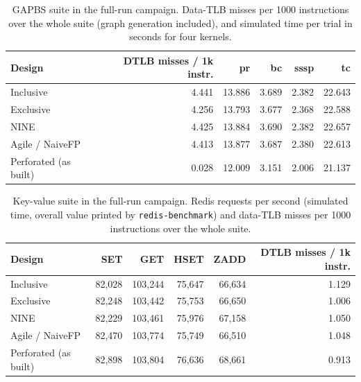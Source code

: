 \begin{table}[H]
\centering
\small
\caption{GAPBS suite in the full-run campaign. Data-TLB misses per 1000 instructions over the whole suite (graph generation included), and simulated time per trial in seconds for four kernels.}
\label{tab:fullrun_gapbs}
\begin{tabular}{l r r r r r}
\toprule
\textbf{Design} & \textbf{DTLB misses / 1k instr.} & \textbf{pr} & \textbf{bc} & \textbf{sssp} & \textbf{tc} \\
\midrule
Inclusive & 4.441 & 13.886 & 3.689 & 2.382 & 22.643 \\
Exclusive & 4.256 & 13.793 & 3.677 & 2.368 & 22.588 \\
NINE & 4.425 & 13.884 & 3.690 & 2.382 & 22.657 \\
Agile / NaiveFP & 4.413 & 13.877 & 3.687 & 2.380 & 22.613 \\
Perforated (as built) & 0.028 & 12.009 & 3.151 & 2.006 & 21.137 \\
\bottomrule
\end{tabular}
\end{table}

\begin{table}[H]
\centering
\small
\caption{Key-value suite in the full-run campaign. Redis requests per second (simulated time, overall value printed by \texttt{redis-benchmark}) and data-TLB misses per 1000 instructions over the whole suite.}
\label{tab:fullrun_kv}
\begin{tabular}{l r r r r r}
\toprule
\textbf{Design} & \textbf{SET} & \textbf{GET} & \textbf{HSET} & \textbf{ZADD} & \textbf{DTLB misses / 1k instr.} \\
\midrule
Inclusive & 82,028 & 103,244 & 75,647 & 66,634 & 1.129 \\
Exclusive & 82,248 & 103,442 & 75,753 & 66,650 & 1.006 \\
NINE & 82,229 & 103,461 & 75,976 & 67,158 & 1.050 \\
Agile / NaiveFP & 82,470 & 103,774 & 75,749 & 66,510 & 1.048 \\
Perforated (as built) & 82,898 & 103,804 & 76,636 & 68,661 & 0.913 \\
\bottomrule
\end{tabular}
\end{table}

